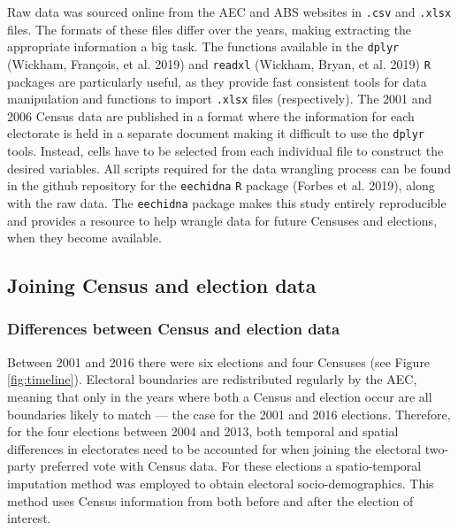 \documentclass[times, doublespace]{anzsauth}
\begin{document}
Raw data was sourced online from the AEC and ABS websites in \texttt{.csv} and \texttt{.xlsx} files. The formats of these files differ over the years, making extracting the appropriate information a big task. The functions available in the \texttt{dplyr} (Wickham, François, et al. 2019) and \texttt{readxl} (Wickham, Bryan, et al. 2019) \texttt{R} packages are particularly useful, as they provide fast consistent tools for data manipulation and functions to import \texttt{.xlsx} files (respectively). The 2001 and 2006 Census data are published in a format where the information for each electorate is held in a separate document making it difficult to use the \texttt{dplyr} tools. Instead, cells have to be selected from each individual file to construct the desired variables. All scripts required for the data wrangling process can be found in the github repository for the \texttt{eechidna} \texttt{R} package (Forbes et al. 2019), along with the raw data. The \texttt{eechidna} package makes this study entirely reproducible and provides a resource to help wrangle data for future Censuses and elections, when they become available.

\hypertarget{joining-census-and-election-data}{%
\subsection{Joining Census and election data}\label{joining-census-and-election-data}}

\hypertarget{differences-between-census-and-election-data}{%
\subsubsection{Differences between Census and election data}\label{differences-between-census-and-election-data}}

Between 2001 and 2016 there were six elections and four Censuses (see Figure \ref{fig:timeline}). Electoral boundaries are redistributed regularly by the AEC, meaning that only in the years where both a Census and election occur are all boundaries likely to match --- the case for the 2001 and 2016 elections. Therefore, for the four elections between 2004 and 2013, both temporal and spatial differences in electorates need to be accounted for when joining the electoral two-party preferred vote with Census data. For these elections a spatio-temporal imputation method was employed to obtain electoral socio-demographics. This method uses Census information from both before and after the election of interest.
\end{document}
